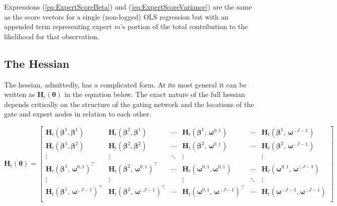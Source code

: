 \documentclass[12pt]{article}
\newcommand{\bw}[1]{\boldsymbol{\omega}^{#1}}
\newcommand{\Ht}[1]{\mathbf{H}_{t}(#1)}
\theoremstyle{definition}
\begin{document}
Expressions (\ref{eq:ExpertScoreBeta}) and (\ref{eq:ExpertScoreVariance})
are the same as the score vectors for a single (non-logged) OLS regression but
with an appended term representing expert $m$'s portion of the total
contribution to the likelihood for that observation.


\subsection{The Hessian} \label{sec:TheHessian}

The hessian, admittedly, has a complicated form. At its most general it
can be written as $\Ht{\boldsymbol{\theta}}$ in the equation below. The
exact nature of the full hessian depends critically on the structure of the
gating network and the locations of the gate and expert nodes in relation to 
each other.

\begin{equation} \label{eq:FullHessian}
  \Ht{\boldsymbol{\theta}} =  \begin{bmatrix}
  \Ht{\boldsymbol{\beta}^{1}, \boldsymbol{\beta}^{1}}                       & \Ht{\boldsymbol{\beta}^{2}, \boldsymbol{\beta}^{1}}                      & \cdots & \Ht{ \boldsymbol{\beta}^{1}, \,  \bw{0, 1} }                & \cdots & \Ht{ \boldsymbol{\beta}^{1}, \,  \bw{\boldsymbol{\cdot}, J - 1} }     \\
  \Ht{\boldsymbol{\beta}^{1}, \boldsymbol{\beta}^{2}}                       & \Ht{\boldsymbol{\beta}^{2}, \boldsymbol{\beta}^{2}}                      & \cdots & \Ht{\boldsymbol{\beta}^{2}, \, \bw{0, 1}}                   & \cdots & \Ht{\boldsymbol{\beta}^{2}, \, \bw{\boldsymbol{\cdot}, J - 1}}        \\
  \vdots                                                                    & \vdots                                                                   & \ddots & \vdots                                                      &        & \vdots                                                                \\
  \Ht{ \boldsymbol{\beta}^{1}, \,  \bw{0, 1} }^{\top}                       & \Ht{ \boldsymbol{\beta}^{2}, \,  \bw{0, 1} }^{\top}                      & \cdots & \Ht{\bw{0, 1}, \bw{0, 1}}                                   & \cdots & \Ht{\bw{0, 1}, \, \bw{\boldsymbol{\cdot}, J - 1} }                    \\
  \vdots                                                                    & \vdots                                                                   &        & \vdots                                                      & \ddots & \vdots                                                                \\
  \Ht{ \boldsymbol{\beta}^{1}, \,  \bw{\boldsymbol{\cdot}, J - 1} }^{\top}  & \Ht{ \boldsymbol{\beta}^{2}, \,  \bw{\boldsymbol{\cdot}, J - 1} }^{\top} & \cdots & \Ht{ \bw{0, 1}, \,  \bw{\boldsymbol{\cdot}, J - 1} }^{\top} & \cdots & \Ht{ \bw{\boldsymbol{\cdot}, J - 1}, \bw{\boldsymbol{\cdot}, J - 1}}  \\
    \end{bmatrix}
\end{equation}
\end{document}
